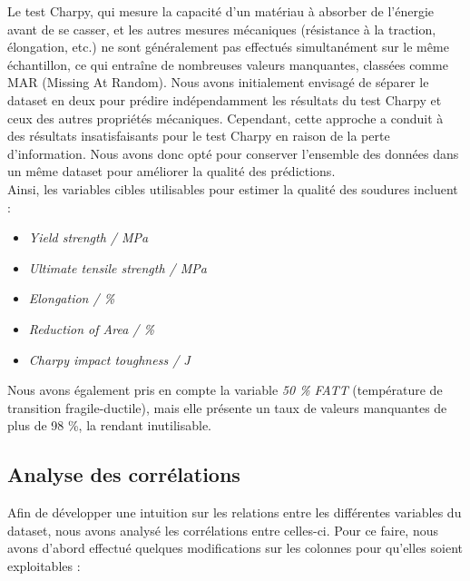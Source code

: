 \documentclass{article}
\begin{document}
Le test Charpy, qui mesure la capacité d'un matériau à absorber de l'énergie avant de se casser, et les autres mesures mécaniques (résistance à la traction, élongation, etc.) ne sont généralement pas effectués simultanément sur le même échantillon, ce qui entraîne de nombreuses valeurs manquantes, classées comme MAR (Missing At Random). Nous avons initialement envisagé de séparer le dataset en deux pour prédire indépendamment les résultats du test Charpy et ceux des autres propriétés mécaniques. Cependant, cette approche a conduit à des résultats insatisfaisants pour le test Charpy en raison de la perte d'information. Nous avons donc opté pour conserver l'ensemble des données dans un même dataset pour améliorer la qualité des prédictions.\\

Ainsi, les variables cibles utilisables pour estimer la qualité des soudures incluent :

\begin{itemize} \item \textit{Yield strength / MPa} \item \textit{Ultimate tensile strength / MPa} \item \textit{Elongation / \%} \item \textit{Reduction of Area / \%} \item \textit{Charpy impact toughness / J} \end{itemize}

Nous avons également pris en compte la variable \textit{50 \% FATT} (température de transition fragile-ductile), mais elle présente un taux de valeurs manquantes de plus de 98 \%, la rendant inutilisable.

\subsection{Analyse des corrélations}

Afin de développer une intuition sur les relations entre les différentes variables du dataset, nous avons analysé les corrélations entre celles-ci. Pour ce faire, nous avons d’abord effectué quelques modifications sur les colonnes pour qu'elles soient exploitables :
\end{document}
